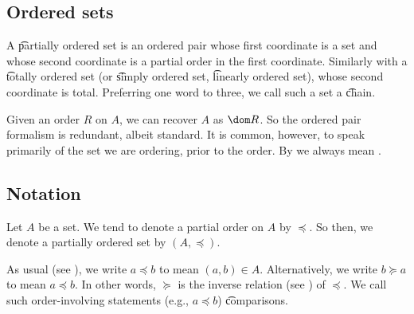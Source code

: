 \subsection*{Ordered sets}

A \t{partially ordered set} is an ordered pair whose first coordinate is a set and whose second coordinate is a partial order in the first coordinate.
Similarly with a \t{totally ordered set} (or \t{simply ordered set}, \t{linearly ordered set}), whose second coordinate is total.
Preferring one word to three, we call such a set a \t{chain}.

Given an order $R$ on $A$, we can recover $A$ as $\dom R$.
So the ordered pair formalism is redundant, albeit standard.
It is common, however, to speak primarily of the set we are ordering, prior to the order.
By  we always mean .

\subsection*{Notation}

Let $A$ be a set.
We tend to denote a partial order on $A$ by $\preceq$.
So then, we denote a partially ordered set by $(A, \preceq)$.

As usual (see ), we write $a \preceq b$ to mean $(a, b) \in A$.
Alternatively, we write $b \succeq a$ to mean $a \preceq b$.
In other words, $\succeq$ is the inverse relation (see ) of $\preceq$.
We call such order-involving statements (e.g., $a \preceq b$) \t{comparisons}.

